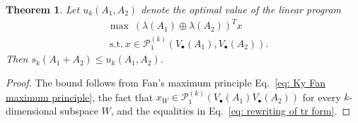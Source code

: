 \documentclass[12pt]{article}
\newtheorem{thm}{Theorem}[section]
\theoremstyle{definition}
\numberwithin{equation}{section}
\numberwithin{equation}{section}
\newcommand{\la}{\lambda}
\newcommand{\cP}{\mathcal{P}}
\begin{document}
\begin{thm}
\label{thm: linear programming bound}
Let \(u_k(A_1, A_2)\) denote the optimal value of the linear program 
\begin{equation}
\label{def: lin program for thm}
\begin{aligned}
&\max \: (\la (A_1) \oplus \la(A_2))^T x\\
&\: \text{s.t.} \: x \in \cP_1^{(k)} (V_\bullet(A_1), V_\bullet(A_2)).
\end{aligned}
\end{equation}
Then \(s_k (A_1 + A_2) \leq u_k(A_1, A_2)\).
\end{thm}
\begin{proof}
The bound follows from Fan's maximum principle Eq.~\ref{eq: Ky Fan maximum principle}, the fact that \(x_W \in \cP_1^{(k)} (V_\bullet(A_1) V_\bullet(A_2))\) for every \(k\)-dimensional subspace \(W\), and the equalities in Eq.~\ref{eq: rewriting of tr form}. \end{proof}
\end{document}
